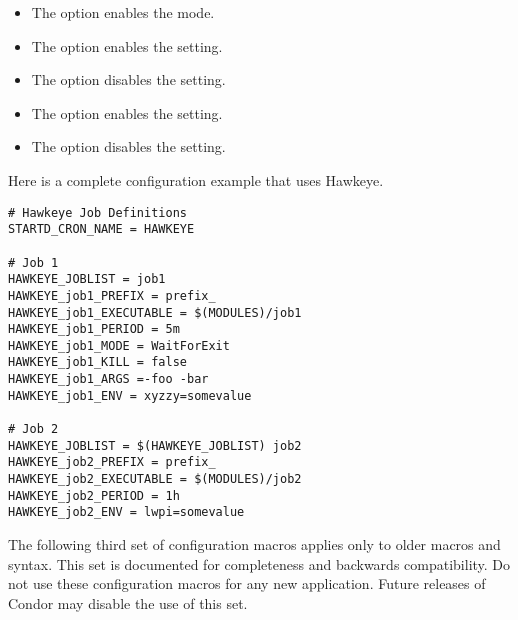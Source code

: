 \begin{description}
  \begin{itemize}

	\item The  option enables the  mode.

	\item The  option enables the  setting.

	\item The  option disables the  setting.

	\item The  option enables the  setting.

	\item The  option disables the  setting.

    \end{itemize}

\end{description}
Here is a complete configuration example that uses Hawkeye.
\begin{verbatim}
# Hawkeye Job Definitions
STARTD_CRON_NAME = HAWKEYE

# Job 1
HAWKEYE_JOBLIST = job1
HAWKEYE_job1_PREFIX = prefix_
HAWKEYE_job1_EXECUTABLE = $(MODULES)/job1
HAWKEYE_job1_PERIOD = 5m
HAWKEYE_job1_MODE = WaitForExit
HAWKEYE_job1_KILL = false
HAWKEYE_job1_ARGS =-foo -bar
HAWKEYE_job1_ENV = xyzzy=somevalue

# Job 2
HAWKEYE_JOBLIST = $(HAWKEYE_JOBLIST) job2
HAWKEYE_job2_PREFIX = prefix_
HAWKEYE_job2_EXECUTABLE = $(MODULES)/job2
HAWKEYE_job2_PERIOD = 1h
HAWKEYE_job2_ENV = lwpi=somevalue
\end{verbatim}


The following 
third set of configuration macros applies only to older
macros and syntax.
This set is documented for completeness and backwards
compatibility.
Do not use these configuration macros for any new application.
Future releases of Condor may disable the use of this set.

